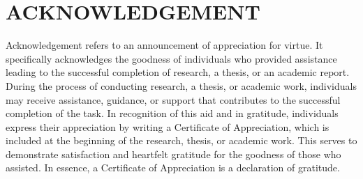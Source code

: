 \chapter*{ACKNOWLEDGEMENT}

Acknowledgement refers to an announcement of appreciation for virtue. It
specifically acknowledges the goodness of individuals who provided assistance leading
to the successful completion of research, a thesis, or an academic report. During the
process of conducting research, a thesis, or academic work, individuals may receive
assistance, guidance, or support that contributes to the successful completion of the
task. In recognition of this aid and in gratitude, individuals express their appreciation
by writing a Certificate of Appreciation, which is included at the beginning of the
research, thesis, or academic work. This serves to demonstrate satisfaction and
heartfelt gratitude for the goodness of those who assisted. In essence, a Certificate of
Appreciation is a declaration of gratitude.

